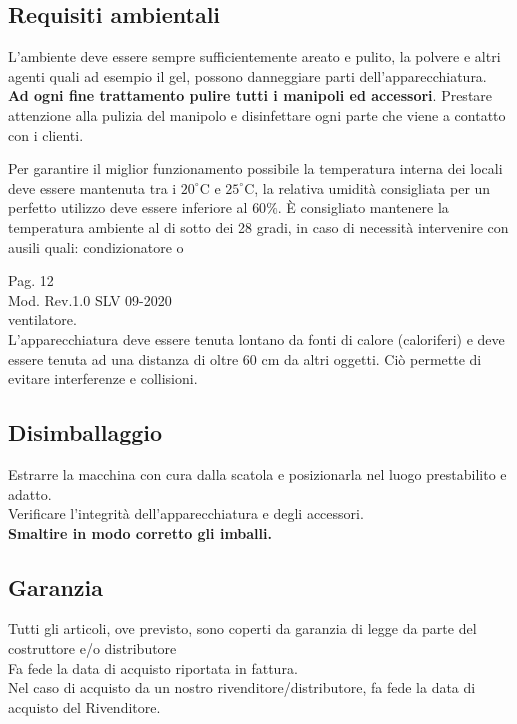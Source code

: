 \documentclass[a4paper]{article}
\begin{document}
\subsection{Requisiti ambientali}
L'ambiente deve essere sempre sufficientemente areato e pulito, la polvere e altri agenti quali ad esempio il gel, possono danneggiare parti dell'apparecchiatura.\\
\textbf{Ad ogni fine trattamento pulire tutti i manipoli ed accessori}. Prestare attenzione alla pulizia del manipolo e disinfettare ogni parte che viene a contatto con i clienti.

Per garantire il miglior funzionamento possibile la temperatura interna dei locali deve essere mantenuta tra i $20^{\circ} \mathrm{C}$ e $25^{\circ} \mathrm{C}$, la relativa umidità consigliata per un perfetto utilizzo deve essere inferiore al $60 \%$. È consigliato mantenere la temperatura ambiente al di sotto dei 28 gradi, in caso di necessità intervenire con ausili quali: condizionatore o

Pag. 12\\
Mod. Rev.1.0 SLV 09-2020\\
ventilatore.\\
L'apparecchiatura deve essere tenuta lontano da fonti di calore (caloriferi) e deve essere tenuta ad una distanza di oltre 60 cm da altri oggetti. Ciò permette di evitare interferenze e collisioni.

\subsection{Disimballaggio}
Estrarre la macchina con cura dalla scatola e posizionarla nel luogo prestabilito e adatto.\\
Verificare l'integrità dell'apparecchiatura e degli accessori.\\
\textbf{Smaltire in modo corretto gli imballi.}

\subsection{Garanzia}
Tutti gli articoli, ove previsto, sono coperti da garanzia di legge da parte del costruttore e/o distributore\\
Fa fede la data di acquisto riportata in fattura.\\
Nel caso di acquisto da un nostro rivenditore/distributore, fa fede la data di acquisto del Rivenditore.
\end{document}
